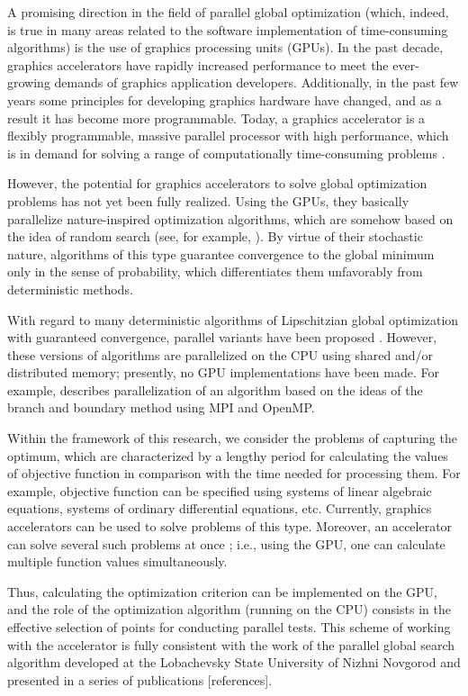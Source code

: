 \documentclass{svproc}
\begin{document}
A promising direction in the field of parallel global optimization (which, indeed, is true in many areas related to the software implementation of time-consuming algorithms) is the use of graphics processing units (GPUs). In the past decade, graphics accelerators have rapidly increased performance to meet the ever-growing demands of graphics application developers. Additionally, in the past few years some principles for developing graphics hardware have changed, and as a result it has become more programmable. Today, a graphics accelerator is a flexibly programmable, massive parallel processor with high performance, which is in demand for solving a range of computationally time-consuming problems \cite{Hwu2011}.

However, the potential for graphics accelerators to solve global optimization problems has not yet been fully realized. Using the GPUs, they basically parallelize nature-inspired optimization algorithms, which are somehow based on the idea of random search (see, for example, \cite{Ferreiro2013,Garcia2014,Langdon2011}). By virtue of their stochastic nature, algorithms of this type guarantee convergence to the global minimum only in the sense of probability, which differentiates them unfavorably from deterministic methods.

With regard to many deterministic algorithms of Lipschitzian global optimization with guaranteed convergence, parallel variants have been proposed \cite{Evtushenko2009,He2008,Paulavicius2011}. However, these versions of algorithms are parallelized on the CPU using shared and/or distributed memory; presently, no GPU implementations have been made. For example, \cite{Paulavicius2011} describes parallelization of an algorithm based on the ideas of the branch and boundary method using MPI and OpenMP.

Within the framework of this research, we consider the problems of capturing the optimum, which are characterized by a lengthy period for calculating the values of objective function in comparison with the time needed for processing them. For example, objective function can be specified using systems of linear algebraic equations, systems of ordinary differential equations, etc. Currently, graphics accelerators can be used to solve problems of this type. Moreover, an accelerator can solve several such problems at once \cite{Kindratenko2014}; i.e., using the GPU, one can calculate multiple function values simultaneously.

Thus, calculating the optimization criterion can be implemented on the GPU, and the role of the optimization algorithm (running on the CPU) consists in the effective selection of points for conducting parallel tests. This scheme of working with the accelerator is fully consistent with the work of the parallel global search algorithm developed at the Lobachevsky State University of Nizhni Novgorod and presented in a series of publications [references].
\end{document}
